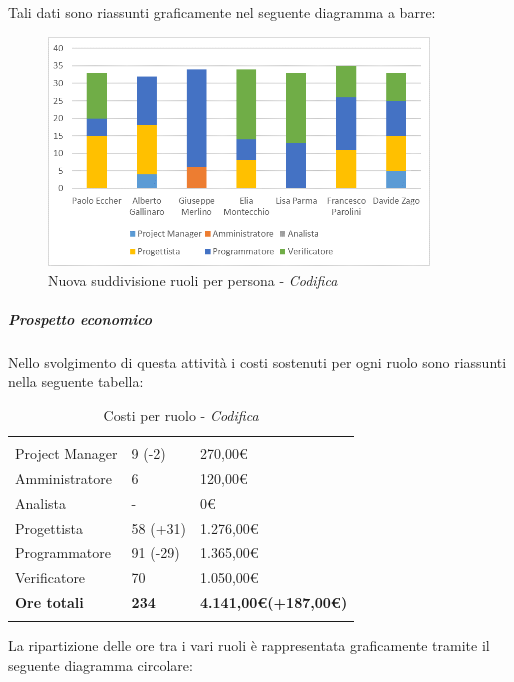 	Tali dati sono riassunti graficamente nel seguente diagramma a barre:

	\begin{figure}[H] 
		\centering 
		\includegraphics[width=0.9\textwidth]{images/BarreCodificaNuova.png} 
		\caption{Nuova suddivisione ruoli per persona - \textit{Codifica}}
		\label{BarreCodifica}
	\end{figure}
	
	\subparagraph{Prospetto economico} \Spazio
	Nello svolgimento di questa attività i costi sostenuti per ogni ruolo sono riassunti nella seguente tabella:
	\begin{table}[H]
		\centering
		\begin{tabular}{|p{4cm}|C{4cm}|C{4cm}|}
			
			 & &\\
			Project Manager & 9 (-2) & 270,00\euro \\
			\hline
			Amministratore& 6 & 120,00\euro \\
			\hline
			Analista & - & 0\euro \\
			\hline
			Progettista & 58 (+31) & 1.276,00\euro \\
			\hline
			Programmatore & 91 (-29) & 1.365,00\euro \\
			\hline
			Verificatore & 70 & 1.050,00\euro \\
			\hline
			\textbf{Ore totali} & \textbf{234} & \textbf{4.141,00\euro(+187,00\euro )} \\
		\end{tabular}
		\caption{Costi per ruolo - \textit{Codifica}}
	\end{table}
	
	La ripartizione delle ore tra i vari ruoli è rappresentata graficamente tramite il seguente diagramma circolare:
	
